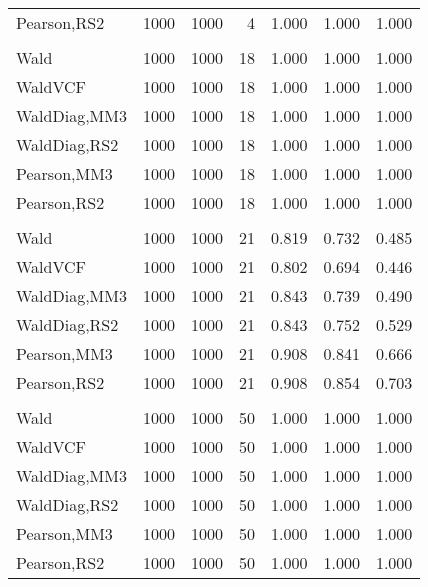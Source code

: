 \documentclass[
]{article}
\begin{document}
\begin{table}[H]
{\begin{tabular}[t]{lrrrrrr}
\hspace{1em}Pearson,RS2 & 1000 & 1000 & 4 & 1.000 & 1.000 & 1.000\\
\addlinespace[0.3em]
\multicolumn{7}{l}{\textbf{1F 15V}}\\
\hspace{1em}Wald & 1000 & 1000 & 18 & 1.000 & 1.000 & 1.000\\
\hspace{1em}WaldVCF & 1000 & 1000 & 18 & 1.000 & 1.000 & 1.000\\
\hspace{1em}WaldDiag,MM3 & 1000 & 1000 & 18 & 1.000 & 1.000 & 1.000\\
\hspace{1em}WaldDiag,RS2 & 1000 & 1000 & 18 & 1.000 & 1.000 & 1.000\\
\hspace{1em}Pearson,MM3 & 1000 & 1000 & 18 & 1.000 & 1.000 & 1.000\\
\hspace{1em}Pearson,RS2 & 1000 & 1000 & 18 & 1.000 & 1.000 & 1.000\\
\addlinespace[0.3em]
\multicolumn{7}{l}{\textbf{2F 10V}}\\
\hspace{1em}Wald & 1000 & 1000 & 21 & 0.819 & 0.732 & 0.485\\
\hspace{1em}WaldVCF & 1000 & 1000 & 21 & 0.802 & 0.694 & 0.446\\
\hspace{1em}WaldDiag,MM3 & 1000 & 1000 & 21 & 0.843 & 0.739 & 0.490\\
\hspace{1em}WaldDiag,RS2 & 1000 & 1000 & 21 & 0.843 & 0.752 & 0.529\\
\hspace{1em}Pearson,MM3 & 1000 & 1000 & 21 & 0.908 & 0.841 & 0.666\\
\hspace{1em}Pearson,RS2 & 1000 & 1000 & 21 & 0.908 & 0.854 & 0.703\\
\addlinespace[0.3em]
\multicolumn{7}{l}{\textbf{3F 15V}}\\
\hspace{1em}Wald & 1000 & 1000 & 50 & 1.000 & 1.000 & 1.000\\
\hspace{1em}WaldVCF & 1000 & 1000 & 50 & 1.000 & 1.000 & 1.000\\
\hspace{1em}WaldDiag,MM3 & 1000 & 1000 & 50 & 1.000 & 1.000 & 1.000\\
\hspace{1em}WaldDiag,RS2 & 1000 & 1000 & 50 & 1.000 & 1.000 & 1.000\\
\hspace{1em}Pearson,MM3 & 1000 & 1000 & 50 & 1.000 & 1.000 & 1.000\\
\hspace{1em}Pearson,RS2 & 1000 & 1000 & 50 & 1.000 & 1.000 & 1.000\\
\bottomrule
\end{tabular}}
\endgroup{}
\end{table}
\end{document}
